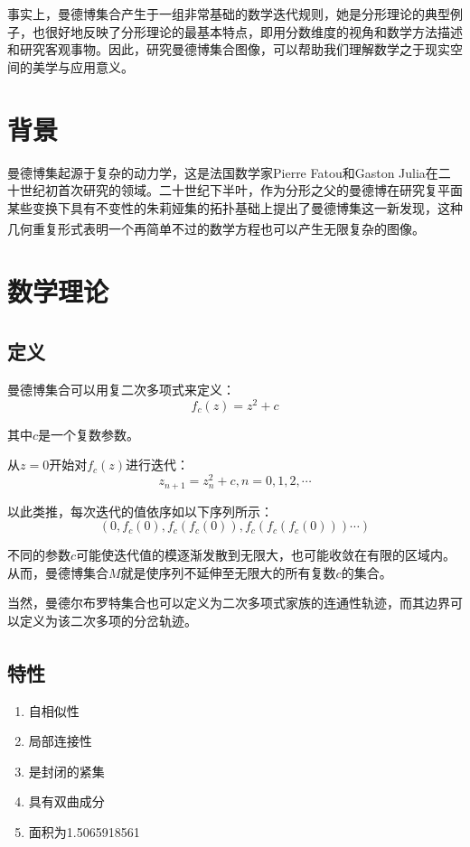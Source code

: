\documentclass{ctexart}
\begin{document}
事实上，曼德博集合产生于一组非常基础的数学迭代规则，她是分形理论的典型例子，也很好地反映了分形理论的最基本特点，即用分数维度的视角和数学方法描述和研究客观事物。因此，研究曼德博集合图像，可以帮助我们理解数学之于现实空间的美学与应用意义。

\section{背景}
曼德博集起源于复杂的动力学，这是法国数学家Pierre Fatou和Gaston Julia在二十世纪初首次研究的领域。二十世纪下半叶，作为分形之父的曼德博在研究复平面某些变换下具有不变性的朱莉娅集的拓扑基础上提出了曼德博集这一新发现，这种几何重复形式表明一个再简单不过的数学方程也可以产生无限复杂的图像。\textsuperscript{\cite{mandelbort_wiki}}

\section{数学理论}
\subsection{定义\textsuperscript{\cite{set_wiki}}\textsuperscript{\cite{set_wolfram}}}
曼德博集合可以用复二次多项式来定义：
$$f_c(z)=z^2+c$$

其中$c$是一个复数参数。

从$z=0$开始对$f_c(z)$进行迭代：
$$z_{n+1}=z^2_n+c,n=0,1,2,\cdots$$

以此类推，每次迭代的值依序如以下序列所示：
$$(0,f_c(0),f_c(f_c(0)),f_c(f_c(f_c(0)))\cdots)$$

不同的参数$c$可能使迭代值的模逐渐发散到无限大，也可能收敛在有限的区域内。从而，曼德博集合$M$就是使序列不延伸至无限大的所有复数$c$的集合。

当然，曼德尔布罗特集合也可以定义为二次多项式家族的连通性轨迹，而其边界可以定义为该二次多项的分岔轨迹。

\subsection{特性\textsuperscript{\cite{set_wiki}}}
\begin{enumerate}
	\item 自相似性
	\item 局部连接性
	\item 是封闭的紧集
	\item 具有双曲成分
    \item 面积为1.5065918561
\end{enumerate}
\end{document}
